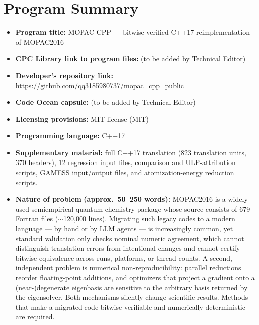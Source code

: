 \documentclass[preprint,12pt]{elsarticle}
\begin{document}
\section*{Program Summary}

\begin{itemize}
\item \textbf{Program title:} MOPAC-CPP --- bitwise-verified C++17 reimplementation of MOPAC2016
\item \textbf{CPC Library link to program files:} (to be added by Technical Editor)
\item \textbf{Developer's repository link:} \url{https://github.com/qq3185980737/mopac_cpp_public}
\item \textbf{Code Ocean capsule:} (to be added by Technical Editor)
\item \textbf{Licensing provisions:} MIT license (MIT)
\item \textbf{Programming language:} C++17
\item \textbf{Supplementary material:} full C++17 translation (823 translation units, 370 headers), 12 regression input files, comparison and ULP-attribution scripts, GAMESS input/output files, and atomization-energy reduction scripts.
\item \textbf{Nature of problem (approx.\ 50--250 words):} MOPAC2016 is a widely used semiempirical quantum-chemistry package whose source consists of 679 Fortran files ($\sim$120{,}000 lines). Migrating such legacy codes to a modern language --- by hand or by LLM agents --- is increasingly common, yet standard validation only checks nominal numeric agreement, which cannot distinguish translation errors from intentional changes and cannot certify bitwise equivalence across runs, platforms, or thread counts. A second, independent problem is numerical non-reproducibility: parallel reductions reorder floating-point additions, and optimizers that project a gradient onto a (near-)degenerate eigenbasis are sensitive to the arbitrary basis returned by the eigensolver. Both mechanisms silently change scientific results. Methods that make a migrated code bitwise verifiable and numerically deterministic are required.

\end{itemize}
\end{document}
